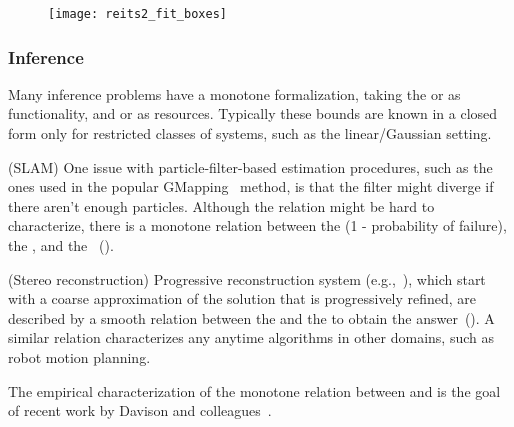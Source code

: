 \begin{figure}[h]
    \centering
\texttt{[image: reits2\_fit\_boxes]}
\caption{\label{fig:packing}}
\end{figure}



\subsubsection{Inference}

Many inference problems have a monotone formalization, taking the
 or  as functionality, and 
or  as resources. Typically these bounds are known in
a closed form only for restricted classes of systems, such as the
linear/Gaussian setting.

\begin{example}
(SLAM) One issue with particle-filter-based estimation procedures,
such as the ones used in the popular GMapping~\cite{grisetti07improved}
method, is that the filter might diverge if there aren't enough particles.
Although the relation might be hard to characterize, there is a monotone
relation between the  (1 - probability of failure),
the , and the ~().
\end{example}

\begin{figure}[h]
    \centering
\caption{\label{fig:gmapping} }
\end{figure}



\begin{example}
(Stereo reconstruction) Progressive reconstruction system (e.g.,~\cite{locher16progressive}),
which start with a coarse approximation of the solution that is progressively
refined, are described by a smooth relation between the 
and the  to obtain the answer~().
A similar relation characterizes any anytime algorithms in other domains,
such as robot motion planning.
\end{example}


\begin{figure}[h]
    \centering
\caption{\label{fig:progressive} }
\end{figure}


\begin{example}
The empirical characterization of the monotone relation between  and 
is the goal of recent work by Davison and colleagues~\cite{nardi15introducing,zia16comparative}.
\end{example}

